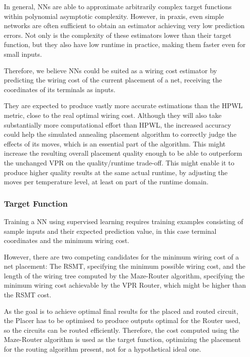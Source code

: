 In general, \glspl{NN} are able to approximate arbitrarily complex target functions\cite{universial-approx-web} within polynomial asymptotic complexity\cite{NN-complexity-web}. However, in praxis, even simple networks are often sufficient to obtain an estimator achieving very low prediction errors. Not only is the complexity of these estimators lower than their target function, but they also have low runtime in practice, making them faster even for small inputs.

Therefore, we believe \glspl{NN} could be suited as a wiring cost estimator by predicting the wiring cost of the current placement of a net, receiving the coordinates of its terminals as inputs. 

They are expected to produce vastly more accurate estimations than the \gls{HPWL} metric, close to the real optimal wiring cost. Although they will also take substantially more computational effort than \gls{HPWL}, the increased accuracy could help the simulated annealing placement algorithm to correctly judge the effects of its moves, which is an essential part of the algorithm. This might increase the resulting overall placement quality enough to be able to outperform the unchanged \gls{VPR} on the quality/runtime trade-off. This might enable it to produce higher quality results at the same actual runtime, by adjusting the moves per temperature level, at least on part of the runtime domain.

\pagebreak

\subsubsection{Target Function}

Training a \gls{NN} using supervised learning requires training examples consisting of sample inputs and their expected prediction value, in this case terminal coordinates and the minimum wiring cost.

However, there are two competing candidates for the minimum wiring cost of a net placement: The \gls{RSMT}, specifying the minimum possible wiring cost, and the length of the wiring tree computed by the Maze-Router algorithm\cite{Maze-Router}, specifying the minimum wiring cost achievable by the \gls{VPR} Router, which might be higher than the \gls{RSMT} cost.

As the goal is to achieve optimal final results for the placed and routed circuit, the Placer has to be optimised to produce outputs optimal for the Router used, so the circuits can be routed efficiently. Therefore, the cost computed using the Maze-Router algorithm is used as the target function, optimizing the placement for the routing algorithm present, not for a hypothetical ideal one.

